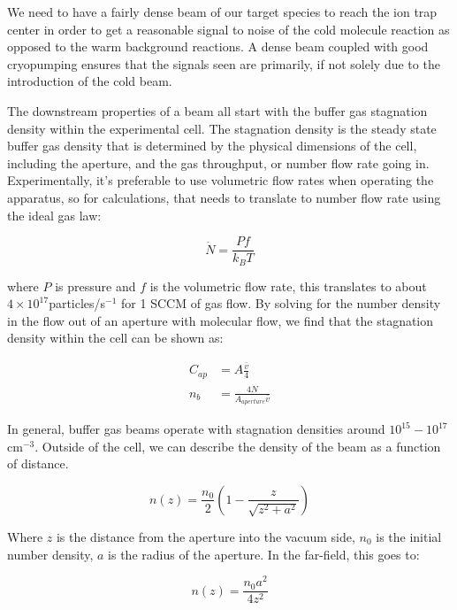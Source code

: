 We need to have a fairly dense beam of our target species to reach the ion trap center in order to get a reasonable signal to noise of the cold molecule reaction as opposed to the warm background reactions. A dense beam coupled with good cryopumping ensures that the signals seen are primarily, if not solely due to the introduction of the cold beam.

The downstream properties of a beam all start with the buffer gas stagnation density within the experimental cell. The stagnation density is the steady state buffer gas density that is determined by the physical dimensions of the cell, including the aperture, and the gas throughput, or number flow rate going in. Experimentally, it's preferable to use volumetric flow rates when operating the apparatus, so for calculations, that needs to translate to number flow rate using the ideal gas law:

\begin{equation*}
	\dot{N} = \frac{P f}{k_B T}
\end{equation*}

where $P$ is pressure and $f$ is the volumetric flow rate, this translates to about $4\times10^{17}$particles/s$^{-1}$ for 1 SCCM of gas flow. By solving for the number density in the flow out of an aperture with molecular flow, we find that the stagnation density within the cell can be shown as:

\begin{align}
	C_{ap} & = A \frac{\bar{v}}{4} \nonumber \\
	n_{b} & = \frac{4 \dot{N}}{A_{aperture} \bar{v}} \label{eq: n_b}
\end{align}

In general, buffer gas beams operate with stagnation densities around $10^{15}-10^{17}$cm$^{-3}$. Outside of the cell, we can describe the density of the beam as a function of distance. \cite{Pauly}

\begin{equation}
	n(z)=\frac{n_0}{2}\left(1-\frac{z}{\sqrt{z^2+a^2}}\right)
	\label{eq: n(z)}
\end{equation}

Where $z$ is the distance from the aperture into the vacuum side, $n_0$ is the initial number density, $a$ is the radius of the aperture. In the far-field, this goes to:

\begin{equation*}
	n(z)=\frac{n_0 a^2}{4 z^2}
\end{equation*}

